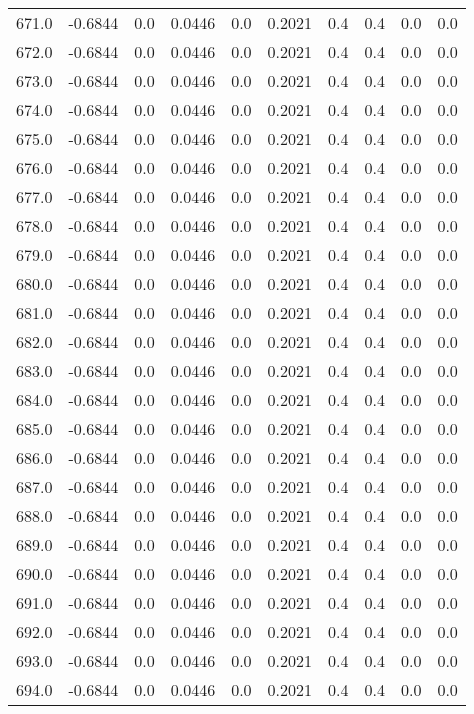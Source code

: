 \begin{longtable}{lrrrrrrrrr}
671.0 & -0.6844 & 0.0 & 0.0446 & 0.0 & 0.2021 & 0.4 & 0.4 & 0.0 & 0.0 \\
672.0 & -0.6844 & 0.0 & 0.0446 & 0.0 & 0.2021 & 0.4 & 0.4 & 0.0 & 0.0 \\
673.0 & -0.6844 & 0.0 & 0.0446 & 0.0 & 0.2021 & 0.4 & 0.4 & 0.0 & 0.0 \\
674.0 & -0.6844 & 0.0 & 0.0446 & 0.0 & 0.2021 & 0.4 & 0.4 & 0.0 & 0.0 \\
675.0 & -0.6844 & 0.0 & 0.0446 & 0.0 & 0.2021 & 0.4 & 0.4 & 0.0 & 0.0 \\
676.0 & -0.6844 & 0.0 & 0.0446 & 0.0 & 0.2021 & 0.4 & 0.4 & 0.0 & 0.0 \\
677.0 & -0.6844 & 0.0 & 0.0446 & 0.0 & 0.2021 & 0.4 & 0.4 & 0.0 & 0.0 \\
678.0 & -0.6844 & 0.0 & 0.0446 & 0.0 & 0.2021 & 0.4 & 0.4 & 0.0 & 0.0 \\
679.0 & -0.6844 & 0.0 & 0.0446 & 0.0 & 0.2021 & 0.4 & 0.4 & 0.0 & 0.0 \\
680.0 & -0.6844 & 0.0 & 0.0446 & 0.0 & 0.2021 & 0.4 & 0.4 & 0.0 & 0.0 \\
681.0 & -0.6844 & 0.0 & 0.0446 & 0.0 & 0.2021 & 0.4 & 0.4 & 0.0 & 0.0 \\
682.0 & -0.6844 & 0.0 & 0.0446 & 0.0 & 0.2021 & 0.4 & 0.4 & 0.0 & 0.0 \\
683.0 & -0.6844 & 0.0 & 0.0446 & 0.0 & 0.2021 & 0.4 & 0.4 & 0.0 & 0.0 \\
684.0 & -0.6844 & 0.0 & 0.0446 & 0.0 & 0.2021 & 0.4 & 0.4 & 0.0 & 0.0 \\
685.0 & -0.6844 & 0.0 & 0.0446 & 0.0 & 0.2021 & 0.4 & 0.4 & 0.0 & 0.0 \\
686.0 & -0.6844 & 0.0 & 0.0446 & 0.0 & 0.2021 & 0.4 & 0.4 & 0.0 & 0.0 \\
687.0 & -0.6844 & 0.0 & 0.0446 & 0.0 & 0.2021 & 0.4 & 0.4 & 0.0 & 0.0 \\
688.0 & -0.6844 & 0.0 & 0.0446 & 0.0 & 0.2021 & 0.4 & 0.4 & 0.0 & 0.0 \\
689.0 & -0.6844 & 0.0 & 0.0446 & 0.0 & 0.2021 & 0.4 & 0.4 & 0.0 & 0.0 \\
690.0 & -0.6844 & 0.0 & 0.0446 & 0.0 & 0.2021 & 0.4 & 0.4 & 0.0 & 0.0 \\
691.0 & -0.6844 & 0.0 & 0.0446 & 0.0 & 0.2021 & 0.4 & 0.4 & 0.0 & 0.0 \\
692.0 & -0.6844 & 0.0 & 0.0446 & 0.0 & 0.2021 & 0.4 & 0.4 & 0.0 & 0.0 \\
693.0 & -0.6844 & 0.0 & 0.0446 & 0.0 & 0.2021 & 0.4 & 0.4 & 0.0 & 0.0 \\
694.0 & -0.6844 & 0.0 & 0.0446 & 0.0 & 0.2021 & 0.4 & 0.4 & 0.0 & 0.0 \\

\end{longtable}
